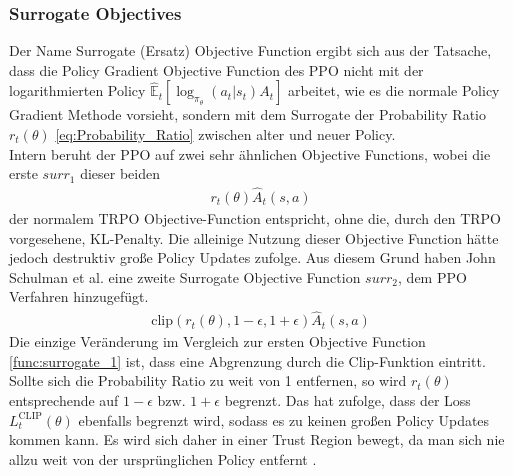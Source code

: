 \subsubsection{Surrogate Objectives} \label{sec:Surrogate_Objectives}
Der Name Surrogate (Ersatz) Objective Function ergibt sich aus der Tatsache, dass die Policy Gradient Objective Function des PPO nicht mit der logarithmierten Policy $\mathbb{\hat{E}}_t[\log_{\pi_{\theta}}(a_t|s_t)A_t]$ arbeitet, wie es die normale Policy Gradient Methode vorsieht, sondern mit dem Surrogate der Probability Ratio $r_{t}(\theta)$ \ref{eq:Probability_Ratio} zwischen alter und neuer Policy.\\
Intern beruht der PPO auf zwei sehr ähnlichen Objective Functions, wobei die erste $surr_1$ dieser beiden
\begin{align}
	\label{func:surrogate_1}
	r_{t}(\theta) \hat{A}_{t}(s, a)
\end{align}
der normalem TRPO Objective-Function entspricht, ohne die, durch den TRPO vorgesehene, KL-Penalty. \cite[S. 3 f.]{PPO}
Die alleinige Nutzung dieser Objective Function hätte jedoch destruktiv große Policy Updates zufolge. Aus diesem Grund haben John Schulman et al. eine zweite Surrogate Objective Function $surr_2$, dem PPO Verfahren hinzugefügt. 
\begin{align}
	\text{clip}(r_{t}(\theta), 1 - \epsilon, 1 + \epsilon) \hat{A}_{t}(s, a)
\end{align}
Die einzige Veränderung im Vergleich zur ersten Objective Function \ref{func:surrogate_1} ist, dass eine Abgrenzung durch die Clip-Funktion eintritt. Sollte sich die Probability Ratio zu weit von 1 entfernen, so wird $r_{t}(\theta)$ entsprechende auf $1 - \epsilon \text{ bzw. } 1 + \epsilon$ begrenzt. Das hat zufolge, dass der Loss $L^{\text{CLIP}}_{t}(\theta)$ ebenfalls begrenzt wird, sodass es zu keinen großen Policy Updates kommen kann. Es wird sich daher in einer Trust Region bewegt, da man sich nie allzu weit von der ursprünglichen Policy entfernt \cite{TRPO, PPO}.

